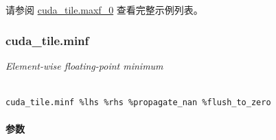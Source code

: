 \documentclass{article}
\begin{document}
请参阅 \href{https://docs.nvidia.com/cuda/tile-ir/latest/sections/appendix.html#example-cuda-tile-maxf-0}{cuda\_tile.maxf\_0} 查看完整示例列表。





\subsubsection{cuda\_tile.minf}


\textit{Element-wise floating-point minimum}




\begin{lstlisting}

cuda_tile.minf %lhs %rhs %propagate_nan %flush_to_zero

\end{lstlisting}



\paragraph{参数}
\end{document}
